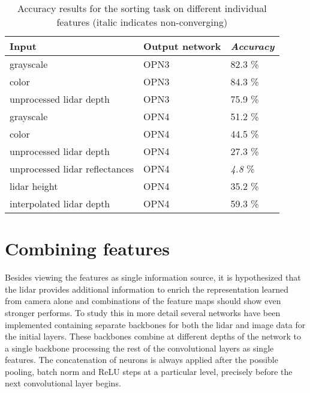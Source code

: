 \begin{table}[]
\centering
\caption{Accuracy results for the sorting task on different individual features (italic indicates non-converging)}
\label{tab:indiv_results}
\begin{tabular}{|p{7.5cm}|p{2cm}|p{2cm}|}
\hline
\textbf{Input}                                                          & \textbf{Output network} & \textit{\textbf{Accuracy}} \\ \hline
grayscale                                                               & OPN3                    & 82.3 \%                   \\ \hline
color                                                                   & OPN3                    & 84.3 \%                   \\ \hline
unprocessed lidar depth                                                 & OPN3                    & 75.9 \%                   \\ \hline
grayscale                                                               & OPN4                    & 51.2 \%                   \\ \hline
color                                                                   & OPN4                    & 44.5 \%                   \\ \hline
unprocessed lidar depth                                                 & OPN4                    & 27.3 \%                   \\ \hline
unprocessed lidar reflectances                                          & OPN4                    & \textit{4.8} \%                   \\ \hline
lidar height                                                            & OPN4                    & 35.2 \%                   \\ \hline
interpolated lidar depth                                                & OPN4                    & 59.3 \%                   \\ \hline
\end{tabular}
\end{table}

\section{Combining features}
Besides viewing the features as single information source, it is hypothesized that the lidar provides additional information to enrich the representation learned from camera alone and combinations of the feature maps should show even stronger performs. To study this in more detail several networks have been implemented containing separate backbones for both the lidar and image data for the initial layers. These backbones combine at different depths of the network to a single backbone processing the rest of the convolutional layers as single features. The concatenation of neurons is always applied after the possible pooling, batch norm and ReLU steps at a particular level, precisely before the next convolutional layer begins.

